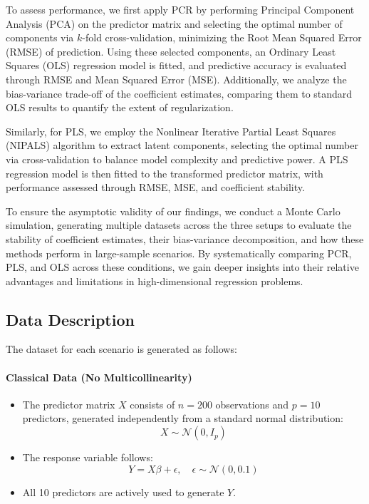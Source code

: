 \documentclass[11pt,twoside,a4paper]{article}
\begin{document}
To assess performance, we first apply PCR by performing Principal Component Analysis (PCA) on the predictor matrix and selecting the optimal number of components via \( k \)-fold cross-validation, minimizing the Root Mean Squared Error (RMSE) of prediction. Using these selected components, an Ordinary Least Squares (OLS) regression model is fitted, and predictive accuracy is evaluated through RMSE and Mean Squared Error (MSE). Additionally, we analyze the bias-variance trade-off of the coefficient estimates, comparing them to standard OLS results to quantify the extent of regularization. 

Similarly, for PLS, we employ the Nonlinear Iterative Partial Least Squares (NIPALS) algorithm to extract latent components, selecting the optimal number via cross-validation to balance model complexity and predictive power. A PLS regression model is then fitted to the transformed predictor matrix, with performance assessed through RMSE, MSE, and coefficient stability. 

To ensure the asymptotic validity of our findings, we conduct a Monte Carlo simulation, generating multiple datasets across the three setups to evaluate the stability of coefficient estimates, their bias-variance decomposition, and how these methods perform in large-sample scenarios. By systematically comparing PCR, PLS, and OLS across these conditions, we gain deeper insights into their relative advantages and limitations in high-dimensional regression problems.


\subsection{Data Description}
The dataset for each scenario is generated as follows:

\paragraph{Classical Data (No Multicollinearity)}
\begin{itemize}
    \item The predictor matrix \( X \) consists of \( n = 200 \) observations and \( p = 10 \) predictors, generated independently from a standard normal distribution:
    \[ X \sim \mathcal{N}(0, I_p) \]
    \item The response variable follows:
    \[ Y = X \beta + \epsilon, \quad \epsilon \sim \mathcal{N}(0, 0.1) \]
    \item All 10 predictors are actively used to generate \( Y \).
\end{itemize}
\end{document}
